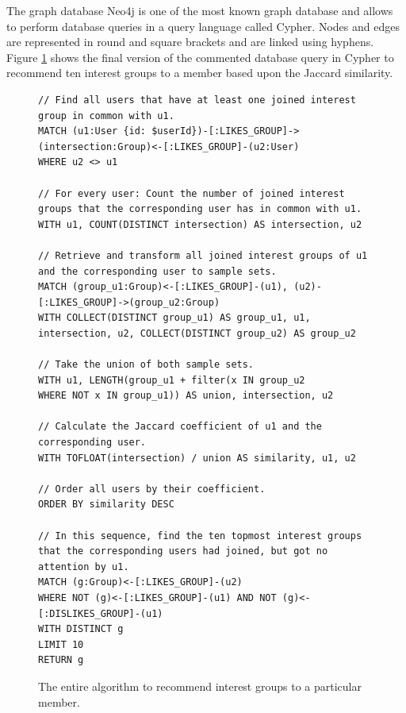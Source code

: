 \documentclass[12pt,numbers=noenddot,parskip,bibliography=totocnumbered,listof=totocnumbered,draft]{scrreprt}
\begin{document}
The graph database \mbox{Neo4j} \citep{neo4j} is one of the most known graph database and allows to perform database queries in a query language called Cypher. Nodes and edges are represented in round and square brackets and are linked using hyphens. Figure \ref{recommendationalogrithminterestgroups} shows the final version of the commented database query in Cypher to recommend ten interest groups to a member based upon the Jaccard similarity.

\begin{figure}
\centering
\begin{lstlisting}
// Find all users that have at least one joined interest group in common with u1.
MATCH (u1:User {id: $userId})-[:LIKES_GROUP]->(intersection:Group)<-[:LIKES_GROUP]-(u2:User) 
WHERE u2 <> u1 

// For every user: Count the number of joined interest groups that the corresponding user has in common with u1.
WITH u1, COUNT(DISTINCT intersection) AS intersection, u2 

// Retrieve and transform all joined interest groups of u1 and the corresponding user to sample sets.
MATCH (group_u1:Group)<-[:LIKES_GROUP]-(u1), (u2)-[:LIKES_GROUP]->(group_u2:Group) 
WITH COLLECT(DISTINCT group_u1) AS group_u1, u1, intersection, u2, COLLECT(DISTINCT group_u2) AS group_u2 

// Take the union of both sample sets.
WITH u1, LENGTH(group_u1 + filter(x IN group_u2 
WHERE NOT x IN group_u1)) AS union, intersection, u2 

// Calculate the Jaccard coefficient of u1 and the corresponding user. 
WITH TOFLOAT(intersection) / union AS similarity, u1, u2 

// Order all users by their coefficient.
ORDER BY similarity DESC 

// In this sequence, find the ten topmost interest groups that the corresponding users had joined, but got no attention by u1.
MATCH (g:Group)<-[:LIKES_GROUP]-(u2) 
WHERE NOT (g)<-[:LIKES_GROUP]-(u1) AND NOT (g)<-[:DISLIKES_GROUP]-(u1) 
WITH DISTINCT g
LIMIT 10
RETURN g
\end{lstlisting}
\caption[Algorithm to recommend interest groups]{The entire algorithm to recommend interest groups to a particular member.}
\label{recommendationalogrithminterestgroups}
\end{figure}
\end{document}
